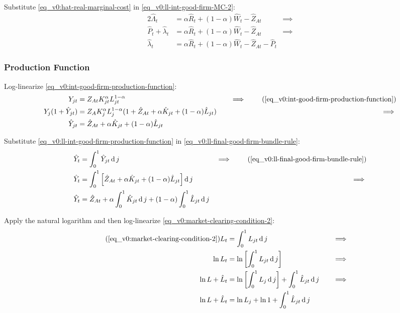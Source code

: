 \documentclass[
thesis.tex
]{subfiles}
\begin{document}
	Substitute \ref{eq_v0:hat-real-marginal-cost} in \ref{eq_v0:ll-int-good-firm-MC-2}:
	\begin{alignat}{2}
		\hat{\Lambda}_t &= \alpha \hat{R}_t + (1- \alpha) \hat{W}_t - \hat{Z}_{At} &\implies \nonumber \\
		\hat{P}_t + \hat{\lambda}_t &= \alpha \hat{R}_t + (1- \alpha) \hat{W}_t - \hat{Z}_{At} &\implies \nonumber \\
		\hat{\lambda}_t &= \alpha \hat{R}_t + (1- \alpha) \hat{W}_t - \hat{Z}_{At} - \hat{P}_t \label{eq_v0:ll-int-good-firm-MC-3}
	\end{alignat}
	
	
	\subsubsection*{Production Function}
	
	Log-linearize \ref{eq_v0:int-good-firm-production-function}:
	\begin{alignat}{2}
		Y_{jt} &= Z_{At} K_{jt}^\alpha L_{jt}^{1-\alpha} &\implies \tag{\ref{eq_v0:int-good-firm-production-function}} \\
		Y_{j} (1+ \hat{Y}_{jt}) &= Z_{A} K_{j}^\alpha L_{j}^{1-\alpha} (1+ \hat{Z}_{At} + \alpha \hat{K}_{jt} + (1-\alpha) \hat{L}_{jt}) \quad &\implies \nonumber \\
		\hat{Y}_{jt} &= \hat{Z}_{At} + \alpha \hat{K}_{jt} + (1-\alpha) \hat{L}_{jt} \label{eq_v0:ll-int-good-firm-production-function}
	\end{alignat}
	
	Substitute \ref{eq_v0:ll-int-good-firm-production-function} in \ref{eq_v0:ll-final-good-firm-bundle-rule}:
	\begin{alignat}{2}
		\hat{Y}_t &= \int_{0}^{1} \hat{Y}_{jt} \dif j &\implies \tag{\ref{eq_v0:ll-final-good-firm-bundle-rule}} \\
		\hat{Y}_t &= \int_{0}^{1} \left[ \hat{Z}_{At} + \alpha \hat{K}_{jt} + (1-\alpha) \hat{L}_{jt} \right] \dif j &\implies \nonumber \\
		\hat{Y}_t &= \hat{Z}_{At} + \alpha \int_{0}^{1} \hat{K}_{jt} \dif j + (1-\alpha) \int_{0}^{1} \hat{L}_{jt} \dif j \label{eq_v0:ll-final-good-firm-bundle-rule-2}
	\end{alignat}
	
	Apply the natural logarithm and then log-linearize \ref{eq_v0:market-clearing-condition-2}:
	\begin{alignat}{2}
		\tag{\ref{eq_v0:market-clearing-condition-2}}
		L_t &= \int_{0}^{1} L_{jt} \dif j &\implies \\
		\ln L_t &= \ln \left[ \int_{0}^{1} L_{jt} \dif j \right] &\implies \nonumber \\
		\ln L + \hat{L}_t &= \ln \left[ \int_{0}^{1} L_{j} \dif j \right] + \int_{0}^{1} \hat{L}_{jt} \dif j \quad &\implies \nonumber \\
		\ln L + \hat{L}_t &= \ln L_{j} + \ln 1 + \int_{0}^{1} \hat{L}_{jt} \dif j \nonumber
	\end{alignat}
	
\end{document}
